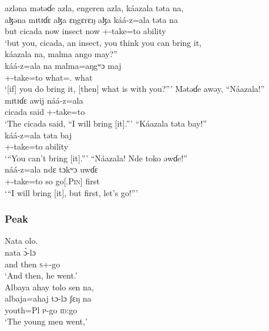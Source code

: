  \medskip
 azləna  mətəɗe  azla,  engeren  azla,   káazala  təta  na, \\
 \gll aɮəna  mɪtɪɗɛ    aɮa   ɛŋgɛrɛŋ   aɮa káá-z=ala təta          na\\
 but    cicada    now      insect     now   {\twoS}+{\POT}-take=to    ability   {\PSP}\\
 \glt ‘but you, cicada, an insect, you think you can bring it,\\
 
 \medskip
  káazala  na,  malma  ango  may?”\\
 \gll káá-z=ala     na  malma=aŋgʷɔ    maj\\
 {\twoS}+{\POT}-take=to  {\PSP}   what={\twoS}.{\POSS}  what\\
 \glt ‘[if] you do bring it,  [then] what is with you?”’
 \z
\ea  Mətəɗe  awəy,  “Náazala!”\\                   
 \gll mɪtɪɗɛ  awij náá-z=ala\\
 cicada          said    {\oneS}+{\POT}-take=to\\      
 \glt ‘The cicada said, “I will bring [it].”’
 \z
\ea  “Káazala   təta   bay!”\\
 \gll káá-z=ala     təta     baj\\
 {\twoS}+{\POT}-take=to  ability  {\NEG}\\
 \glt ‘“You can’t bring [it].”’
 \z
\ea  “Náazala!  Nde  toko  əwɗe!”\\                
 \gll náá-z=ala ndɛ tɔkʷɔ     uwɗɛ\\
 {\oneS}+{\POT}-take=to  so  go[{\IMP}.\textsc{Pin}]    first\\
 \glt ‘“I will bring [it], but first, let’s go!”’
 \z
 \subsubsection*{Peak}
\ea  Nata  olo.\\
 \gll nata      \`ɔ-lɔ\\
 {and then}     \textsc{s}+{\PFV}-go  \\
 \glt ‘And then, he went.’\\
 \z
\ea  Albaya  ahay  tolo  sen  na,    \\
\gll albaja=ahaj   tɔ-lɔ    ʃɛŋ      na\\
 youth=Pl      \textsc{p}-go   \textsc{id}:go   {\PSP}  \\
 \glt ‘The young men went,’\\
 
